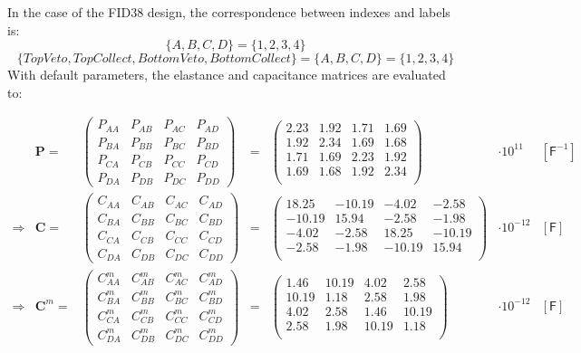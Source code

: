 In the case of the FID38 design, the correspondence between indexes and labels is:
$$\{A,B,C,D\} = \{1,2,3,4\}$$
$$\{ Top Veto, Top Collect, Bottom Veto, Bottom Collect \} = \{A,B,C,D\} = \{ 1,2,3,4\}$$
With default parameters, the elastance and capacitance matrices are evaluated to:

\begin{equation} 
\label{eq:fid38-matrix-evaluation}
\begin{array}{rrccclc}
 & \bm{P} = &
 \begin{pmatrix}
P_{AA} & P_{AB} & P_{AC} & P_{AD} \\ 
P_{BA} & P_{BB} & P_{BC} & P_{BD} \\ 
P_{CA} & P_{CB} & P_{CC} & P_{CD} \\ 
P_{DA} & P_{DB} & P_{DC} & P_{DD}
\end{pmatrix}
&=&
\begin{pmatrix}
2.23 & 1.92 & 1.71 & 1.69 \\
1.92 & 2.34 & 1.69 & 1.68 \\
1.71 & 1.69 & 2.23 & 1.92 \\
1.69 & 1.68 & 1.92 & 2.34 \\
\end{pmatrix}
& \cdot 10^{11} & [\textsf{F}^{-1}] \\
\Rightarrow & \bm{C} = &
\begin{pmatrix}
C_{AA} & C_{AB} & C_{AC} & C_{AD} \\ 
C_{BA} & C_{BB} & C_{BC} & C_{BD} \\ 
C_{CA} & C_{CB} & C_{CC} & C_{CD} \\ 
C_{DA} & C_{DB} & C_{DC} & C_{DD}
\end{pmatrix}
&=&
\begin{pmatrix}
18.25 & -10.19 & -4.02 & -2.58 \\
-10.19 & 15.94 & -2.58 & -1.98 \\
-4.02 & -2.58 & 18.25 & -10.19 \\
-2.58 & -1.98 & -10.19 & 15.94 \\
\end{pmatrix}
& \cdot 10^{-12} & [\textsf{F}] \\
\Rightarrow & \bm{C}^m = &
\begin{pmatrix}
C_{AA}^m & C_{AB}^m & C_{AC}^m & C_{AD}^m \\ 
C_{BA}^m & C_{BB}^m & C_{BC}^m & C_{BD}^m \\ 
C_{CA}^m & C_{CB}^m & C_{CC}^m & C_{CD}^m \\ 
C_{DA}^m & C_{DB}^m & C_{DC}^m & C_{DD}^m
\end{pmatrix}
&=&
\begin{pmatrix}
1.46 & 10.19 & 4.02 & 2.58 \\
10.19 & 1.18 & 2.58 & 1.98 \\
4.02 & 2.58 & 1.46 & 10.19 \\
2.58 & 1.98 & 10.19 & 1.18 \\
\end{pmatrix}
& \cdot 10^{-12} & [\textsf{F}]
\end{array}
\end{equation}

